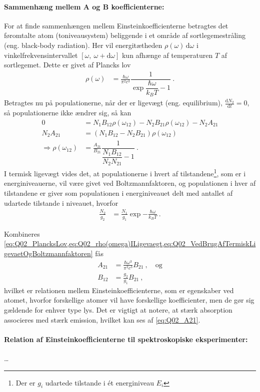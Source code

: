 \paragraph{Sammenhæng mellem A og B koefficienterne:} For at finde sammenhængen mellem Einsteinkoefficienterne betragtes det føromtalte atom (toniveausystem) beliggende i et område af sortlegemestråling (eng. black-body radiation). Her vil energitætheden $\rho(\omega)\,\text{d}\omega$ i vinkelfrekvensintervallet $[\omega,\: \omega + \text{d}\omega]$ kun afhænge af temperaturen $T$ af sortlegemet. Dette er givet af Plancks lov
\begin{align} \label{eq:Q02_PlancksLov}
    \rho(\omega) &= \frac{\hbar\omega}{\pi^2c^3} \dfrac{1}{\exp{\dfrac{\hbar\omega}{k_B T}} - 1} \: .
\end{align}
Betragtes nu på populationerne, når der er ligevægt (eng. equilibrium), $\frac{\text{d}N_2}{\text{d}t} = 0$, så populationerne ikke ændrer sig, så kan 
\begin{align} \label{eq:Q02_rho(omega)ILigevaegt}
    0 &= N_1 B_{12} \rho(\omega_{12}) - N_2 B_{21} \rho(\omega_{12}) - N_2 A_{21} \nonumber\\
    N_2 A_{21} &= \left(N_1 B_{12} - N_2 B_{21}\right) \rho(\omega_{12}) \nonumber\\
    \Rightarrow \rho(\omega_{12}) &= \frac{A_{21}}{B_{21}} \dfrac{1}{\dfrac{N_1 B_{12}}{N_2 N_{21}} - 1} \: .
\end{align}
I termisk ligevægt vides det, at populationerne i hvert af tilstandene\footnote{Der er $g_i$ udartede tilstande i ét energiniveau $E_i$}, som er i energiniveauerne, vil være givet ved Boltzmannfaktoren, og populationen i hver af tilstandene er giver som populationen i energiniveauet delt med antallet af udartede tilstande i niveauet, hvorfor
\begin{align} \label{eq:Q02_VedBrugAfTermiskLigevaetOgBoltzmannfaktoren}
    \frac{N_2}{g_2} &= \frac{N_1}{g_1}\exp{-\frac{\hbar\omega}{k_B T}} \: .
\end{align}

Kombineres \cref{eq:Q02_PlancksLov,eq:Q02_rho(omega)ILigevaegt,eq:Q02_VedBrugAfTermiskLigevaetOgBoltzmannfaktoren} fås
\begin{align}
    A_{21} & =\frac{\hbar\omega^3}{\pi^2c^3} B_{21} \: , \quad \text{og} \label{eq:Q02_A21} \\
    B_{12} &= \frac{g_2}{g_1} B_{21} \: , \label{eq:Q02_B12SomFunktionAfB21}
\end{align}
hvilket er relationen mellem Einsteinkoefficienterne, som er egenskaber ved atomet, hvorfor forskellige atomer vil have forskellige koefficienter, men de gør sig gældende for enhver type lys. Det er vigtigt at notere, at stærk absorption associeres med stærk emission, hvilket kan ses af \cref{eq:Q02_A21}.


\paragraph{Relation af Einsteinkoefficienterne til spektroskopiske eksperimenter:} \ldots